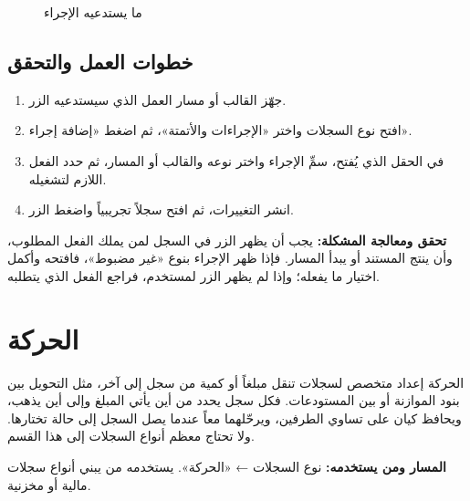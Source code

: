 \begin{figure}[H]
\centering
{}
\rclegend
\caption{ما يستدعيه الإجراء}
\label{fig:builder-actions-model}
\end{figure}

\subsection{خطوات العمل والتحقق}
\begin{enumerate}
\item جهّز القالب أو مسار العمل الذي سيستدعيه الزر.
\item افتح نوع السجلات واختر «الإجراءات والأتمتة»، ثم اضغط «إضافة إجراء».
\item في الحقل الذي يُفتح، سمِّ الإجراء واختر نوعه والقالب أو المسار، ثم حدد الفعل اللازم لتشغيله.
\item انشر التغييرات، ثم افتح سجلاً تجريبياً واضغط الزر.
\end{enumerate}

\textbf{تحقق ومعالجة المشكلة:} يجب أن يظهر الزر في السجل لمن يملك الفعل المطلوب، وأن ينتج المستند أو يبدأ المسار. فإذا ظهر الإجراء بنوع «غير مضبوط»، فافتحه وأكمل اختيار ما يفعله؛ وإذا لم يظهر الزر لمستخدم، فراجع الفعل الذي يتطلبه.

\clearpage
\section{الحركة}
\label{sec:builder-feature-movement}

الحركة إعداد متخصص لسجلات تنقل مبلغاً أو كمية من سجل إلى آخر، مثل التحويل بين بنود الموازنة أو بين المستودعات. فكل سجل يحدد من أين يأتي المبلغ وإلى أين يذهب، ويحافظ كيان على تساوي الطرفين، ويرحّلهما معاً عندما يصل السجل إلى حالة تختارها. ولا تحتاج معظم أنواع السجلات إلى هذا القسم.

\textbf{المسار ومن يستخدمه:} نوع السجلات ← «الحركة». يستخدمه من يبني أنواع سجلات مالية أو مخزنية.

